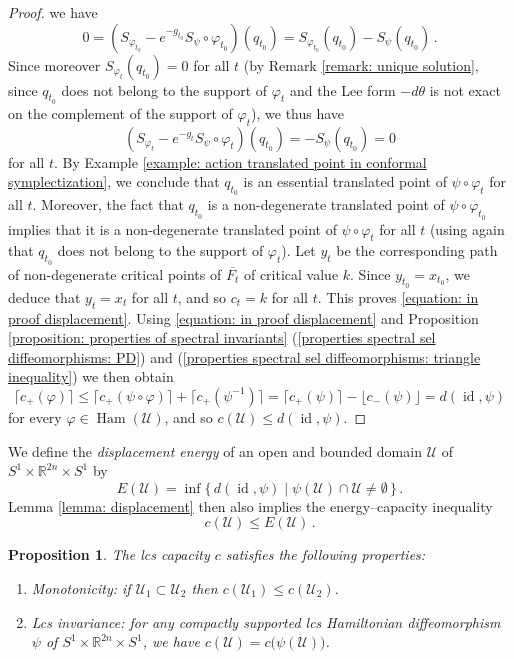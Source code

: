 \documentclass{amsart}
\DeclareMathOperator{\Ham}{Ham}
\DeclareMathOperator{\id}{id}
\newtheorem{prop}[thm]{Proposition}
\theoremstyle{remark}
\begin{document}
\begin{proof}
we have
$$
0 = (S_{\varphi_{t_0}} - e^{-g_{t_0}} S_{\psi} \circ \varphi_{t_0}) (q_{t_0})
= S_{\varphi_{t_0}} (q_{t_0}) - S_{\psi} (q_{t_0}) \,.
$$
Since moreover $S_{\varphi_t} (q_{t_0}) = 0$ for all $t$
(by Remark \ref{remark: unique solution},
since $q_{t_0}$ does not belong to the support of $\varphi_t$
and the Lee form $-d\theta$ is not exact
on the complement of the support of $\varphi_t$),
we thus have
\[
(S_{\varphi_t} - e^{-g_t} S_{\psi} \circ \varphi_t) (q_{t_0}) = - S_{\psi} (q_{t_0}) = 0
\]
for all $t$.
By Example \ref{example: action translated point in conformal symplectization},
we conclude that $q_{t_0}$ is an essential translated point
of $\psi \circ \varphi_t$ for all $t$.
Moreover,
the fact that $q_{t_0}$ is a non-degenerate translated point of $\psi \circ \varphi_{t_0}$
implies that it is a non-degenerate translated point of $\psi \circ \varphi_t$ for all $t$
(using again that $q_{t_0}$ does not belong to the support of $\varphi_t$).
Let $y_t$ be the corresponding path of non-degenerate critical points of $\overline{F_t}$
of critical value $k$.
Since $y_{t_0} = x_{t_0}$,
we deduce that $y_t = x_t$ for all $t$,
and so $c_t = k$ for all $t$.
This proves \eqref{equation: in proof displacement}.
Using \eqref{equation: in proof displacement}
and Proposition \ref{proposition: properties of spectral invariants}
(\ref{properties spectral sel diffeomorphisms: PD})
and (\ref{properties spectral sel diffeomorphisms: triangle inequality})
we then obtain
\[
\lceil c_+ (\varphi) \rceil
\leq \lceil c_+ (\psi \circ \varphi) \rceil + \lceil c_+ (\psi^{-1}) \rceil
= \lceil c_+ (\psi) \rceil - \lfloor c_- (\psi) \rfloor
= d (\id, \psi)
\]
for every $\varphi \in \Ham (\mathcal{U})$,
and so $c(\mathcal{U}) \leq d (\id, \psi)$.
\end{proof}

We define the \emph{displacement energy}
of an open and bounded domain $\mathcal{U}$
of $S^1 \times \mathbb{R}^{2n} \times S^1$
by
\[
E (\mathcal{U}) = \inf \{\, d (\id, \psi) \;\lvert\;
\psi (\mathcal{U}) \cap \mathcal{U} \neq \emptyset \,\} \,.
\]
Lemma \ref{lemma: displacement} then also implies
the energy--capacity inequality
\[
c (\mathcal{U}) \leq E (\mathcal{U}) \,.
\]

\begin{prop}\label{proposition: properties lcs capacity}
The lcs capacity $c$ satisfies the following properties:
\renewcommand{\theenumi}{\roman{enumi}}
\begin{enumerate}
\item \label{properties capacity: monotonicity} \emph{Monotonicity:}
if $\mathcal{U}_1 \subset \mathcal{U}_2$
then $c (\mathcal{U}_1) \leq c (\mathcal{U}_2)$.
\item \label{properties capacity: lcs invariance} \emph{Lcs invariance:}
for any compactly supported lcs Hamiltonian diffeomorphism
$\psi$ of $S^1 \times \mathbb{R}^{2n} \times S^1$,
we have $c (\mathcal{U}) = c \big(\psi (\mathcal{U}) \big)$.
\end{enumerate}
\end{prop}
\end{document}
